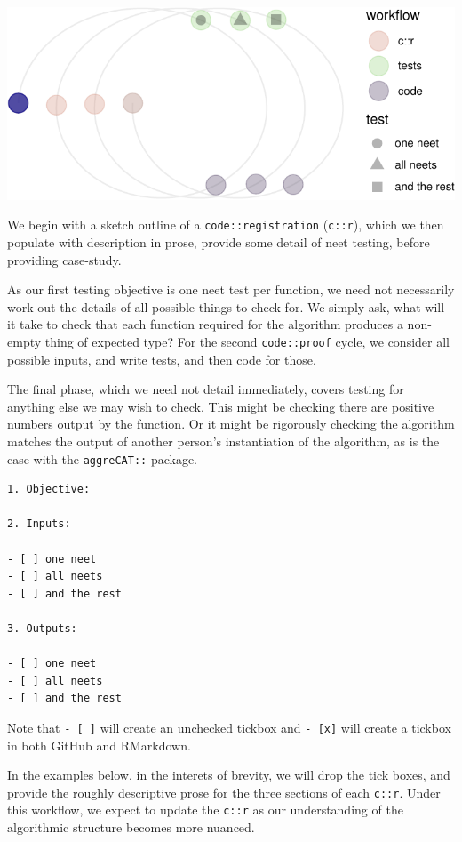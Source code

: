 \documentclass[
]{article}
\begin{document}
\begin{center}\includegraphics{when-is-done-done_files/figure-latex/unnamed-chunk-3-1} \end{center}

We begin with a sketch outline of a \texttt{code::registration}
(\texttt{c::r}), which we then populate with description in prose,
provide some detail of neet testing, before providing case-study.

As our first testing objective is one neet test per function, we need
not necessarily work out the details of all possible things to check
for. We simply ask, what will it take to check that each function
required for the algorithm produces a non-empty thing of expected type?
For the second \texttt{code::proof} cycle, we consider all possible
inputs, and write tests, and then code for those.

The final phase, which we need not detail immediately, covers testing
for anything else we may wish to check. This might be checking there are
positive numbers output by the function. Or it might be rigorously
checking the algorithm matches the output of another person's
instantiation of the algorithm, as is the case with the
\texttt{aggreCAT::} package.

\begin{verbatim}
1. Objective:

2. Inputs:

- [ ] one neet
- [ ] all neets
- [ ] and the rest

3. Outputs:

- [ ] one neet
- [ ] all neets
- [ ] and the rest
\end{verbatim}

Note that \texttt{-\ {[}\ {]}} will create an unchecked tickbox and
\texttt{-\ {[}x{]}} will create a tickbox in both GitHub and RMarkdown.

In the examples below, in the interets of brevity, we will drop the tick
boxes, and provide the roughly descriptive prose for the three sections
of each \texttt{c::r}. Under this workflow, we expect to update the
\texttt{c::r} as our understanding of the algorithmic structure becomes
more nuanced.
\end{document}
